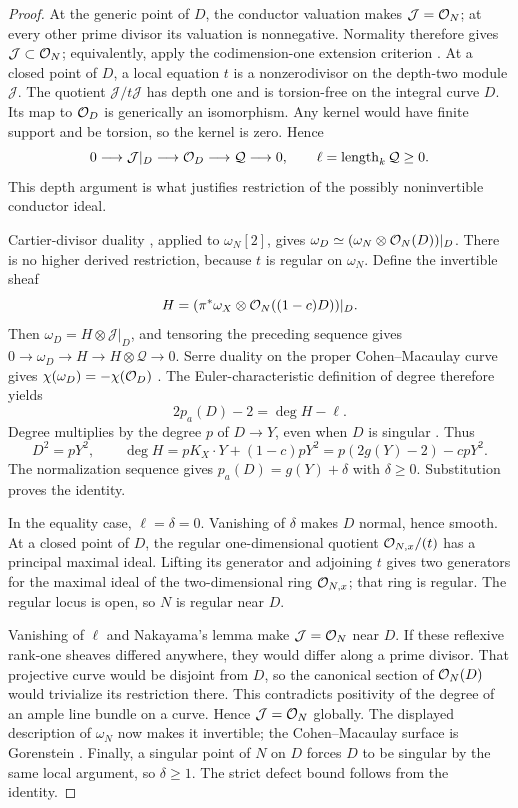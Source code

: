 \begin{proof}
At the generic point of $D$, the conductor valuation makes
$\mathcal J=\mathcal O_N$; at every other prime divisor its valuation is
nonnegative. Normality therefore gives
$\mathcal J\subset\mathcal O_N$; equivalently, apply the codimension-one
extension criterion \cite[Tag 0AY7]{Stacks}.
At a closed point of $D$, a local equation $t$ is a nonzerodivisor
on the depth-two module $\mathcal J$. The quotient $\mathcal J/t\mathcal J$
has depth one and is torsion-free on the integral curve $D$.
Its map to $\mathcal O_D$ is generically an isomorphism. Any kernel would
have finite support and be torsion, so the kernel is zero. Hence
\[
 0\longrightarrow\mathcal J|_D\longrightarrow\mathcal O_D
 \longrightarrow\mathcal Q\longrightarrow0,
 \qquad\ell=\operatorname{length}_k\mathcal Q\geq0.
\]
This depth argument is what justifies restriction of the possibly
noninvertible conductor ideal.

Cartier-divisor duality \cite[Tag 0AA4]{Stacks}, applied to
$\omega_N[2]$, gives
$\omega_D\simeq(\omega_N\otimes\mathcal O_N(D))|_D$.
There is no higher derived restriction, because $t$ is regular on
$\omega_N$. Define the invertible sheaf
\[
 H=(\pi^*\omega_X\otimes\mathcal O_N((1-c)D))|_D.
\]
Then $\omega_D=H\otimes\mathcal J|_D$, and tensoring the preceding
sequence gives $0\to\omega_D\to H\to H\otimes\mathcal Q\to0$.
Serre duality on the proper Cohen--Macaulay curve gives
$\chi(\omega_D)=-\chi(\mathcal O_D)$
\cite[Tag 0FW0]{Stacks}. The Euler-characteristic definition of degree
therefore yields
\[
 2p_a(D)-2=\deg H-\ell.
\]
Degree multiplies by the degree $p$ of $D\to Y$, even when $D$ is
singular \cite[Tag 0AYZ]{Stacks}. Thus
\[
 D^2=pY^2,\qquad
 \deg H=pK_X\cdot Y+(1-c)pY^2
       =p(2g(Y)-2)-cpY^2.
\]
The normalization sequence gives $p_a(D)=g(Y)+\delta$ with
$\delta\geq0$. Substitution proves the identity.

In the equality case, $\ell=\delta=0$. Vanishing of $\delta$ makes
$D$ normal, hence smooth. At a closed point of $D$, the regular
one-dimensional quotient $\mathcal O_{N,x}/(t)$ has a principal maximal
ideal. Lifting its generator and adjoining $t$ gives two generators
for the maximal ideal of the two-dimensional ring $\mathcal O_{N,x}$;
that ring is regular. The regular locus is open, so $N$ is regular
near $D$.

Vanishing of $\ell$ and Nakayama's lemma make
$\mathcal J=\mathcal O_N$ near $D$. If these reflexive rank-one sheaves
differed anywhere, they would differ along a prime divisor. That
projective curve would be disjoint from $D$, so the canonical section
of $\mathcal O_N(D)$ would trivialize its restriction there. This contradicts
positivity of the degree of an ample line bundle on a curve. Hence
$\mathcal J=\mathcal O_N$ globally. The displayed description of $\omega_N$
now makes it invertible; the Cohen--Macaulay surface is Gorenstein
\cite[Tag 0BFQ]{Stacks}. Finally, a singular point of $N$ on $D$
forces $D$ to be singular by the same local argument, so $\delta\geq1$.
The strict defect bound follows from the identity.
\end{proof}

